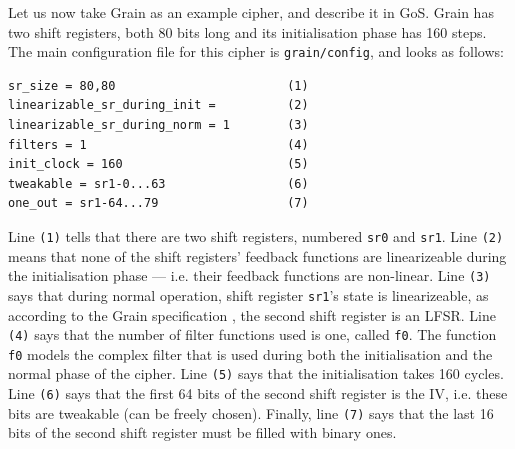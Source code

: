 \documentclass{llncs}
\begin{document}
Let us now take Grain as an example cipher, and describe it in GoS. Grain has two shift registers, both 80 bits long and its initialisation phase has 160 steps. The main configuration file for this cipher is \texttt{grain/config}, and looks as follows:
\begin{Verbatim}[frame=lines]
sr_size = 80,80                        (1)
linearizable_sr_during_init =          (2)
linearizable_sr_during_norm = 1        (3)
filters = 1                            (4)
init_clock = 160                       (5)
tweakable = sr1-0...63                 (6)
one_out = sr1-64...79                  (7)
\end{Verbatim}

Line \texttt{(1)} tells that there are two shift registers, numbered \texttt{sr0} and \texttt{sr1}. Line \texttt{(2)} means that none of the shift registers' feedback functions are linearizeable during the initialisation phase --- i.e. their feedback functions are non-linear. Line \texttt{(3)} says that during normal operation, shift register \texttt{sr1}'s state is linearizeable, as according to the Grain specification \cite{DBLP:journals/ijwmc/HellJM07}, the second shift register is an LFSR. Line \texttt{(4)} says that the number of filter functions used is one, called \texttt{f0}. The function \texttt{f0} models the complex filter that is used during both the initialisation and the normal phase of the cipher. Line \texttt{(5)} says that the initialisation takes 160 cycles. Line \texttt{(6)} says that the first 64 bits of the second shift register is the IV, i.e. these bits are tweakable (can be freely chosen). Finally, line \texttt{(7)} says that the last 16 bits of the second shift register must be filled with binary ones.
\end{document}
